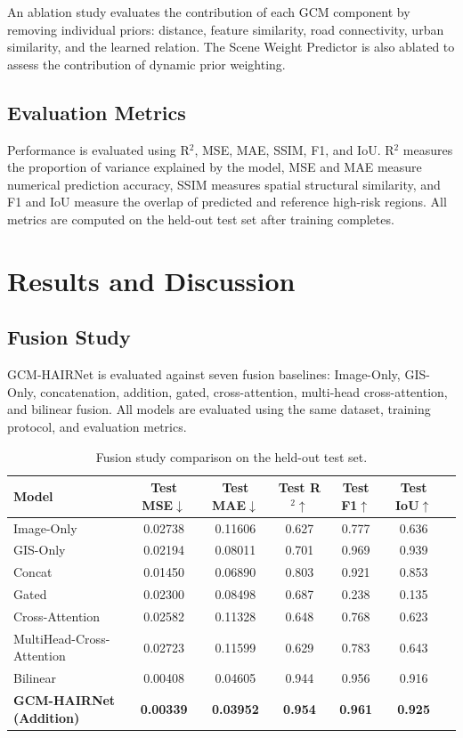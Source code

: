 \documentclass[sigconf, review=true]{acmart}
\begin{document}
An ablation study evaluates the contribution of each GCM component by removing individual priors: distance, feature similarity, road connectivity, urban similarity, and the learned relation. The Scene Weight Predictor is also ablated to assess the contribution of dynamic prior weighting.

\subsection{Evaluation Metrics}

Performance is evaluated using R$^2$, MSE, MAE, SSIM, F1, and IoU. R$^2$ measures the proportion of variance explained by the model, MSE and MAE measure numerical prediction accuracy, SSIM measures spatial structural similarity, and F1 and IoU measure the overlap of predicted and reference high-risk regions. All metrics are computed on the held-out test set after training completes.

\section{Results and Discussion}

\subsection{Fusion Study}

GCM-HAIRNet is evaluated against seven fusion baselines: Image-Only, GIS-Only, concatenation, addition, gated, cross-attention, multi-head cross-attention, and bilinear fusion. All models are evaluated using the same dataset, training protocol, and evaluation metrics.

\begin{table}[t]
  \caption{Fusion study comparison on the held-out test set.}
  \label{tab:fusion}
  \begin{tabular}{lcccccc}
    \toprule
    \textbf{Model} & \textbf{Test MSE}$\downarrow$ & \textbf{Test MAE}$\downarrow$ & \textbf{Test R$^2$}$\uparrow$ & \textbf{Test F1}$\uparrow$ & \textbf{Test IoU}$\uparrow$ \\
    \midrule
    Image-Only & 0.02738 & 0.11606 & 0.627 & 0.777 & 0.636 \\
    GIS-Only   & 0.02194 & 0.08011 & 0.701 & 0.969 & 0.939 \\
    Concat     & 0.01450 & 0.06890 & 0.803 & 0.921 & 0.853 \\
    Gated      & 0.02300 & 0.08498 & 0.687 & 0.238 & 0.135 \\
    Cross-Attention & 0.02582 & 0.11328 & 0.648 & 0.768 & 0.623 \\
    MultiHead-Cross-Attention & 0.02723 & 0.11599 & 0.629 & 0.783 & 0.643 \\
    Bilinear   & 0.00408 & 0.04605 & 0.944 & 0.956 & 0.916 \\
    \textbf{GCM-HAIRNet (Addition)} & \textbf{0.00339} & \textbf{0.03952} & \textbf{0.954} & \textbf{0.961} & \textbf{0.925} \\
    \bottomrule
  \end{tabular}
\end{table}
\end{document}
